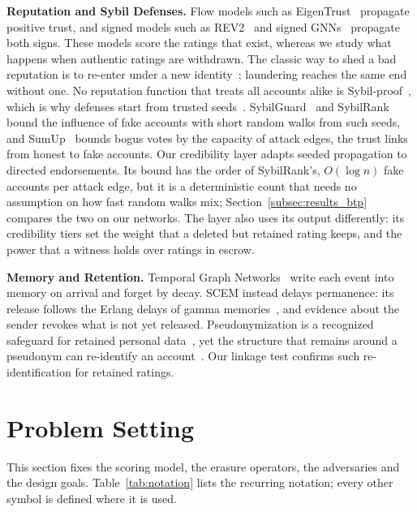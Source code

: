 \documentclass[lettersize,journal]{IEEEtran}
\begin{document}
\smallskip\noindent\textbf{Reputation and Sybil Defenses.}
Flow models such as EigenTrust~\cite{kamvar2003eigentrust} propagate positive trust, and signed models such as REV2~\cite{kumar2018rev2} and signed GNNs~\cite{derr2018signed} propagate both signs.
These models score the ratings that exist, whereas we study what happens when authentic ratings are withdrawn.
The classic way to shed a bad reputation is to re-enter under a new identity~\cite{friedman2001social}; laundering reaches the same end without one.
No reputation function that treats all accounts alike is Sybil-proof~\cite{cheng2005sybilproof}, which is why defenses start from trusted seeds~\cite{gyongyi2004combating}.
SybilGuard~\cite{yu2006sybilguard} and SybilRank~\cite{cao2012aiding} bound the influence of fake accounts with short random walks from such seeds, and SumUp~\cite{tran2009sybil} bounds bogus votes by the capacity of attack edges, the trust links from honest to fake accounts.
Our credibility layer adapts seeded propagation to directed endorsements.
Its bound has the order of SybilRank's, $O(\log n)$ fake accounts per attack edge, but it is a deterministic count that needs no assumption on how fast random walks mix; Section~\ref{subsec:results_btp} compares the two on our networks.
The layer also uses its output differently: its credibility tiers set the weight that a deleted but retained rating keeps, and the power that a witness holds over ratings in escrow.

\smallskip\noindent\textbf{Memory and Retention.}
Temporal Graph Networks~\cite{rossi2020temporal} write each event into memory on arrival and forget by decay.
SCEM instead delays permanence: its release follows the Erlang delays of gamma memories~\cite{devries1990gamma,hurtado2019generalized}, and evidence about the sender revokes what is not yet released.
Pseudonymization is a recognized safeguard for retained personal data~\cite{edpb2025pseudo}, yet the structure that remains around a pseudonym can re-identify an account~\cite{narayanan2009deanonymizing}. Our linkage test confirms such re-identification for retained ratings.

\section{Problem Setting}
\label{sec:system}

This section fixes the scoring model, the erasure operators, the adversaries and the design goals.
Table~\ref{tab:notation} lists the recurring notation; every other symbol is defined where it is used.
\end{document}
